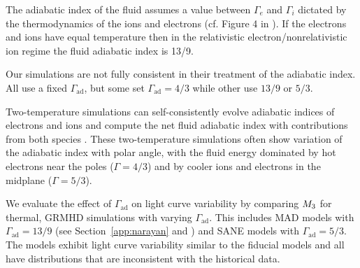 The adiabatic index of the fluid assumes a value between $\Gamma_{e}$ and $\Gamma_{i}$ dictated by the thermodynamics of the ions and electrons (cf. Figure 4 in \citealt{10.1093/mnras/stw3116}).
If the electrons and ions have equal temperature then in the relativistic electron/nonrelativistic ion regime the fluid adiabatic index is 13/9.

Our simulations are not fully consistent in their treatment of the adiabatic index.
All use a fixed $\Gamma_\mathrm{ad}$, but some set $\Gamma_\mathrm{ad} = 4/3$ while other use $13/9$ or $5/3$.

Two-temperature simulations can self-consistently evolve adiabatic indices of electrons and ions and compute the net fluid adiabatic index with contributions from both species \citep{10.1093/mnras/stw3116}.
These two-temperature simulations often show variation of the adiabatic index with polar angle, with the fluid energy dominated by hot electrons near the poles ($\Gamma = 4/3$) and by cooler ions and  electrons in the midplane ($\Gamma=5/3$).

We evaluate the effect of $\Gamma_\mathrm{ad}$ on light curve variability by comparing $M_{3}$ for thermal, GRMHD simulations with varying  $\Gamma_\mathrm{ad}$.
This includes MAD models with $\Gamma_\mathrm{ad}=13/9$ (see Section~\ref{app:narayan} and  \citealt{2021arXiv210812380N}) and SANE models with $\Gamma_\mathrm{ad}=5/3$.
The models exhibit light curve variability similar to the fiducial models and all have  distributions that are inconsistent with the historical data.
